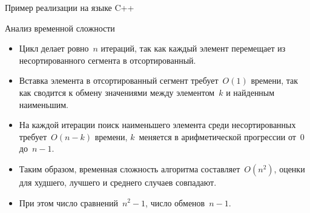 \documentclass[landscape]{slides}
\begin{document}
\begin{slide}
  Пример реализации на языке C++
  
\end{slide}

\begin{slide}
  Анализ временной сложности
  \begin{itemize}
    \item Цикл делает ровно~$n$ итераций, так как каждый элемент перемещает из несортированного сегмента в отсортированный.
    \item Вставка элемента в отсортированный сегмент требует~$O(1)$ времени, так как сводится к обмену значениями между
      элементом~$k$ и найденным наименьшим.
    \item На каждой итерации поиск наименьшего элемента среди несортированных требует~$O(n-k)$ времени,
      $k$~меняется в арифметической прогрессии от~0 до~$n-1$.
    \item Таким образом, временная сложность алгоритма составляет~$O(n^2)$, оценки для худшего, лучшего и среднего случаев
      совпадают.
    \item При этом число сравнений~$n^2-1$, число обменов~$n-1$.
  \end{itemize}
\end{slide}
\end{document}
